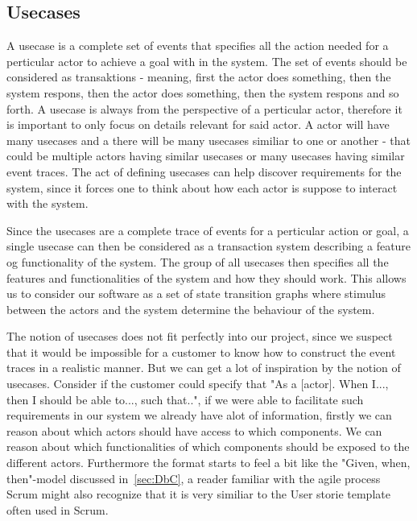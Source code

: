 \subsection{Usecases}
A usecase is a complete set of events that specifies all the action needed for a perticular actor to achieve a goal with in the system. 
The set of events should be considered as transaktions - meaning, first the actor does something, then the system respons, then the actor does something, then the system respons and so forth. 
A usecase is always from the perspective of a perticular actor, therefore it is important to only focus on details relevant for said actor. 
A actor will have many usecases and a there will be many usecases similiar to one or another - that could be multiple actors having similar usecases or many usecases having similar event traces. 
The act of defining usecases can help discover requirements for the system, since it forces one to think about how each actor is suppose to interact with the system.

Since the usecases are a complete trace of events for a perticular action or goal, a single usecase can then be considered as a transaction system describing a feature og functionality of the system. 
The group of all usecases then specifies all the features and functionalities of the system and how they should work. 
This allows us to consider our software as a set of state transition graphs where stimulus between the actors and the system determine the behaviour of the system.

The notion of usecases does not fit perfectly into our project, since we suspect that it would be impossible for a customer to know how to construct the event traces in a realistic manner. 
But we can get a lot of inspiration by the notion of usecases. 
Consider if the customer could specify that "As a [actor]. When I..., then I should be able to..., such that..", if we were able to facilitate such requirements in our system we already have alot of information, firstly we can reason about which actors should have access to which components.
We can reason about which functionalities of which components should be exposed to the different actors.
Furthermore the format starts to feel a bit like the "Given, when, then"-model discussed in~\autoref{sec:DbC}, a reader familiar with the agile process Scrum might also recognize that it is very similiar to the User storie template often used in Scrum.
